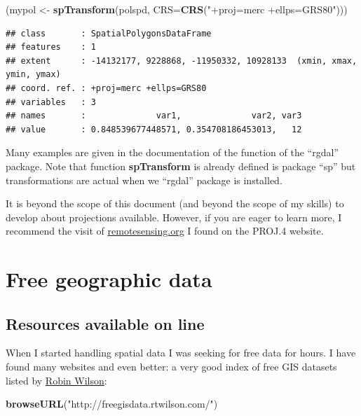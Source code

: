 \documentclass[]{report}
\newenvironment{Shaded}{\begin{snugshade}}{\end{snugshade}}
\newcommand{\DataTypeTok}[1]{\textcolor[rgb]{0.13,0.29,0.53}{#1}}
\newcommand{\KeywordTok}[1]{\textcolor[rgb]{0.13,0.29,0.53}{\textbf{#1}}}
\newcommand{\NormalTok}[1]{#1}
\newcommand{\StringTok}[1]{\textcolor[rgb]{0.31,0.60,0.02}{#1}}
\begin{document}
\begin{Shaded}
\begin{Highlighting}[]
\NormalTok{(mypol <-}\StringTok{ }\KeywordTok{spTransform}\NormalTok{(polspd, }\DataTypeTok{CRS=}\KeywordTok{CRS}\NormalTok{(}\StringTok{"+proj=merc +ellps=GRS80"}\NormalTok{)))}
\end{Highlighting}
\end{Shaded}

\begin{verbatim}
## class       : SpatialPolygonsDataFrame 
## features    : 1 
## extent      : -14132177, 9228868, -11950332, 10928133  (xmin, xmax, ymin, ymax)
## coord. ref. : +proj=merc +ellps=GRS80 
## variables   : 3
## names       :              var1,              var2, var3 
## value       : 0.848539677448571, 0.354708186453013,   12
\end{verbatim}

Many examples are given in the documentation of the function of the
``rgdal'' package. Note that function \textbf{spTransform} is already
defined is package ``sp'' but transformations are actual when we
``rgdal'' package is installed.

It is beyond the scope of this document (and beyond the scope of my
skills) to develop about projections available. However, if you are
eager to learn more, I recommend the visit of
\href{http://www.remotesensing.org/geotiff/proj_list/}{remotesensing.org}
I found on the PROJ.4 website.

\hypertarget{free-geographic-data}{%
\chapter{Free geographic data}\label{free-geographic-data}}

\hypertarget{resources-available-on-line}{%
\section{Resources available on
line}\label{resources-available-on-line}}

When I started handling spatial data I was seeking for free data for
hours. I have found many websites and even better: a very good index of
free GIS datasets listed by
\href{http://freegisdata.rtwilson.com/}{Robin Wilson}:

\begin{Shaded}
\begin{Highlighting}[]
\KeywordTok{browseURL}\NormalTok{(}\StringTok{"http://freegisdata.rtwilson.com/"}\NormalTok{)}
\end{Highlighting}
\end{Shaded}
\end{document}

